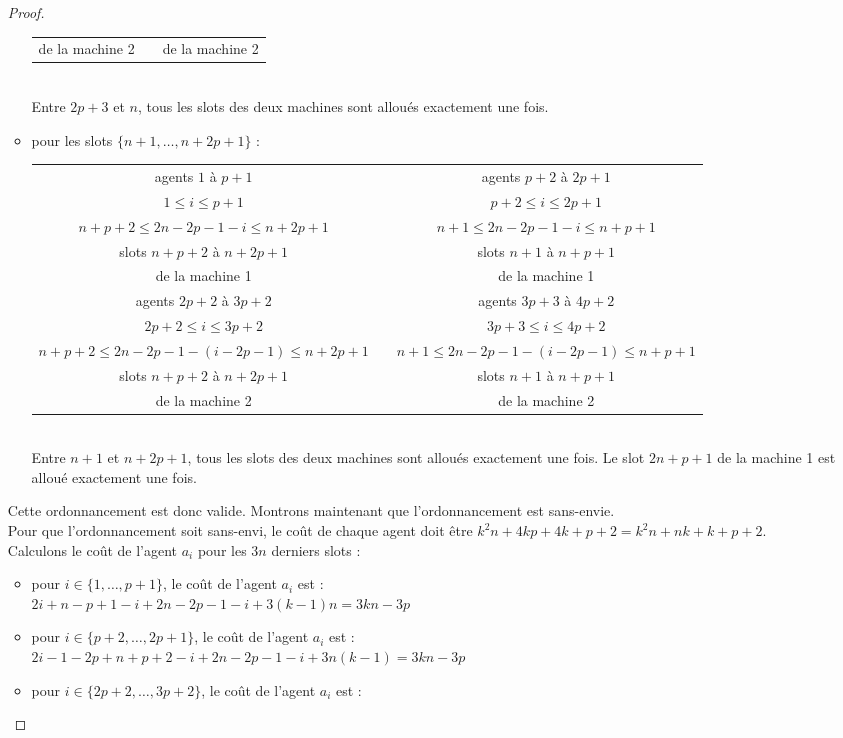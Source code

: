 \documentclass[12pt]{article}
\theoremstyle{definition}
\begin{document}
\begin{itemize}
\begin{proof}
\begin{itemize}
\begin{tabular}{ccc}
de la machine 2   & & de la machine 2       \\
\end{tabular}\\
Entre $2p+3$ et $n$, tous les slots des deux machines sont alloués exactement une fois.
\item pour les slots $\{n+1,\dots,n+2p+1\}$ :\\
\begin{tabular}{ccc}
agents $1$ à $p+1$  & & agents $p+2$ à $2p+1$   \\
$1\leq i \leq p+1 $ & & $p+2\leq i \leq 2p+1$   \\
$n+p+2 \leq 2n-2p-1-i\leq n+2p+1$ & & $n+1\leq 2n-2p-1-i\leq n+p+1$\\
slots $n+p+2$ à $n+2p+1$     & & slots $n+1$ à $n+p+1$  \\
de la machine 1   & & de la machine 1       \\
\hline
agents $2p+2$ à $3p+2$ & & agents $3p+3$ à $4p+2$\\
$2p+2\leq i \leq 3p+2 $ & & $3p+3\leq i \leq 4p+2$   \\
$n+p+2 \leq 2n-2p-1-(i-2p-1)\leq n+2p+1$ & & $n+1\leq 2n-2p-1-(i-2p-1)\leq n+p+1$\\
slots $n+p+2$ à $n+2p+1$     & & slots $n+1$ à $n+p+1$  \\
de la machine 2   & & de la machine 2       \\
\end{tabular}\\
Entre $n+1$ et $n+2p+1$, tous les slots des deux machines sont alloués exactement une fois. Le slot $2n+p+1$ de la machine 1 est alloué exactement une fois.\\
\end{itemize}
Cette ordonnancement est donc valide. Montrons maintenant que l'ordonnancement est sans-envie. \\
Pour que l'ordonnancement soit sans-envi, le coût de chaque agent doit être $k^2n+4kp+4k+p+2=k^2n+nk+k+p+2$.\\
Calculons le coût de l'agent $a_i$ pour les $3n$ derniers slots :
\begin{itemize}
\item pour $i\in \{1,\dots,p+1 \}$, le coût de l'agent $a_i$ est : \\
$2i+n-p+1-i+2n-2p-1-i+ 3(k-1)n=3kn-3p$
\item pour $i\in \{p+2,\dots,2p+1 \}$, le coût de l'agent $a_i$ est : \\
$2i-1-2p+n+p+2-i+2n-2p-1-i +3n(k-1) = 3kn-3p$
\item pour $i\in \{2p+2,\dots,3p+2 \}$, le coût de l'agent $a_i$ est :\\

\end{itemize}
\end{proof}
\end{itemize}
\end{document}
